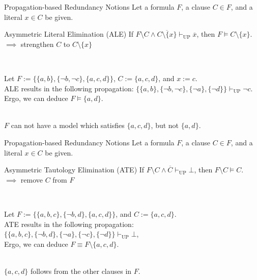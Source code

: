 \documentclass[t]{sdqbeamer}
\begin{document}
\begin{frame}{Propagation-based Redundancy Notions}
Let a formula $F$, a clause $C \in F$, and a literal $x \in C$ be given.~\\[1ex]
\begin{block}{Asymmetric Literal Elimination (ALE)}
If $F \setminus C \land \overline{C \setminus \{ x \}} \vdash_{\mathop{UP}} \overline x$, then $F \models C \setminus \{ x \}$.\\[1ex]
$\implies$ strengthen $C$ to $C \setminus \{ x \}$
\end{block}~\\
\pause
%
\begin{example}
Let $F := \bigl\{ \{a, b\}, \{\lnot b, \lnot c\}, \{a, c, d\} \bigr\}$, $C := \{a, c, d\}$, and $x := c$.\\[1ex]
ALE results in the following propagation: $\bigl\{ \{a, b\}, \{\lnot b, \lnot c\}, \{\lnot a \}, \{\lnot d\} \bigr\} \vdash_{\mathop{UP}} \lnot c$.\\[1ex]
Ergo, we can deduce $F \models \{a, d\}$.
\end{example}~\\
$F$ can not have a model which satisfies $\{a, c, d\}$, but not $\{a, d\}$.
\end{frame}
    

\begin{frame}{Propagation-based Redundancy Notions}
Let a formula $F$, a clause $C \in F$, and a literal $x \in C$ be given.\\[1ex]
\begin{block}{Asymmetric Tautology Elimination (ATE)}
If $F \setminus C \land \overline C \vdash_{\mathop{UP}} \bot$, then $F \setminus C \models C$.\\[1ex]
$\implies$ remove $C$ from $F$
\end{block}~\\
\pause
%
\begin{example}
Let $F := \bigl\{ \{a, b, c\}, \{\lnot b, d\}, \{a, c, d\} \bigr\}$, and $C := \{a, c, d\}$.\\[1ex]
ATE results in the following propagation: $\bigl\{ \{a, b, c\}, \{\lnot b, d\}, \{\lnot a\}, \{\lnot c\}, \{\lnot d\} \bigr\} \vdash_{\mathop{UP}} \bot$,\\[1ex]
Ergo, we can deduce $F \equiv F \setminus \{a,c,d\}$.
\end{example}~\\
$\{a,c,d\}$ follows from the other clauses in $F$.
\end{frame}
\end{document}

